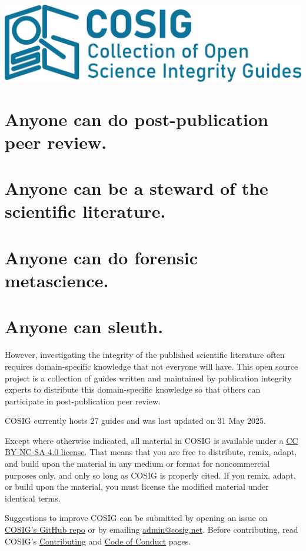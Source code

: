 \documentclass[letterpaper, 12pt]{article}
\begin{document}
\flushleft
\includegraphics[width=\textwidth]{img/home/241017_final_logo_mockup.png}

\section*{Anyone can do post-publication peer review.}
\section*{Anyone can be a steward of the scientific literature.}
\section*{Anyone can do forensic metascience.}
\section*{Anyone can sleuth.}

However, investigating the integrity of the published scientific literature often requires domain-specific knowledge that not everyone will have. This open source project is a collection of guides written and maintained by publication integrity experts to distribute this domain-specific knowledge so that others can participate in post-publication peer review.

COSIG currently hosts 27 guides and was last updated on 31 May 2025.

Except where otherwise indicated, all material in COSIG is available under a \href{https://creativecommons.org/licenses/by-nc-sa/4.0/deed.en}{CC BY-NC-SA 4.0 license}. That means that you are free to distribute, remix, adapt, and build upon the material in any medium or format for noncommercial purposes only, and only so long as COSIG is properly cited. If you remix, adapt, or build upon the material, you must license the modified material under identical terms.

Suggestions to improve COSIG can be submitted by opening an issue on \href{https://github.com/cosig-pppr/cosig/issues}{COSIG's GitHub repo} or by emailing \href{mailto:admin@cosig.net}{admin@cosig.net}. Before contributing, read COSIG's \href{https://github.com/cosig-pppr/cosig/blob/main/CONTRIBUTING.md}{Contributing} and \href{https://github.com/cosig-pppr/cosig/blob/main/CODE_OF_CONDUCT.md}{Code of Conduct} pages.
\end{document}
